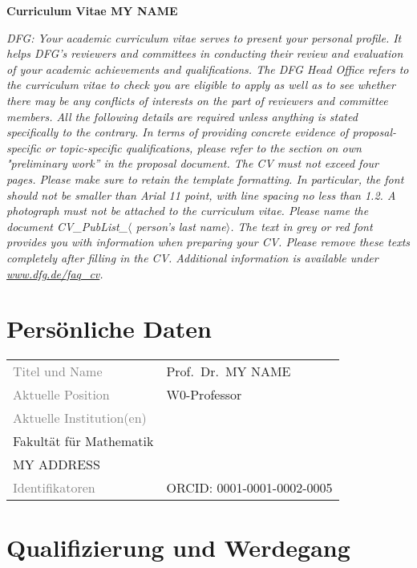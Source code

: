\documentclass[a4paper,11pt]{article}
\def\mytitle{Prof.\ Dr.\ }
\def\myname{MY NAME}
\def\myinstitute{\begin{minipage}[t]{8cm}
MY UNIVERSITY\\
Fakultät für Mathematik\\
MY ADDRESS
\end{minipage}\vspace{.3ex}}
\def\myORCID{0001-0001-0002-0005}
\def\myidentifier{ORCID: \myORCID}
\def\myposition{W0-Professor}
\begin{document}


\thispagestyle{empty}

\mbox{}
\vspace{-9ex}

\centerline{\Large \bf Curriculum Vitae \myname}
\emph{DFG: Your academic curriculum vitae serves to present your personal profile. It helps DFG’s reviewers and committees in conducting their review and evaluation of your academic achievements and qualifications. The DFG Head Office refers to the curriculum vitae to check you are eligible to apply as well as to see whether there may be any conflicts of interests on the part of reviewers and committee members. All the following details are required unless anything is stated specifically to the contrary.
In terms of providing concrete evidence of proposal-specific or topic-specific qualifications, please refer to the section on own "preliminary work” in the proposal document.
The CV must not exceed four pages. Please make sure to retain the template formatting. In particular, the font should not be smaller than Arial 11 point, with line spacing no less than 1.2. A photograph must not be attached to the curriculum vitae. Please 
name the document CV\_PubList\_$\langle$ person’s last name$\rangle$.
The text in grey or red font provides you with information when preparing your CV. Please remove these texts completely after filling in the CV.
Additional information is available under \url{www.dfg.de/faq_cv}.}

\section*{Persönliche Daten}

\noindent
\begin{tabularx}{\textwidth}{@{}ll}
\textcolor{gray}{Titel und Name} & \mytitle \myname \\
\textcolor{gray}{Aktuelle Position} & \myposition \\
\textcolor{gray}{Aktuelle Institution(en)} & \myinstitute \\
\textcolor{gray}{Identifikatoren} & \myidentifier
\end{tabularx}


\section*{Qualifizierung und Werdegang}
\end{document}
